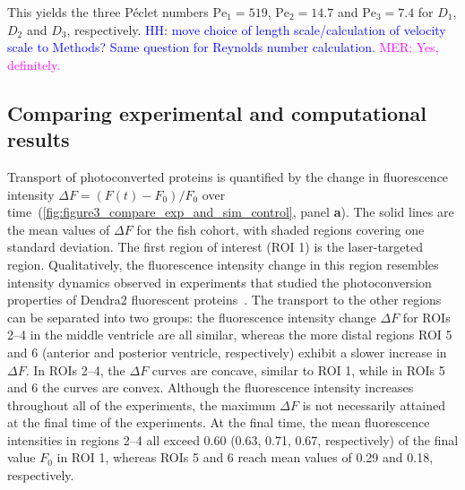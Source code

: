 \documentclass[fleqn]{wlscirep}
\newcommand{\dx}{\, \mathrm d\bm{x}}
\newcommand{\uu}{\mathbf{u}}
\newcommand{\lyng}[1]{\textcolor{blue}{#1}}
\newcommand{\mer}[1]{\textcolor{magenta}{#1}}
\begin{document}
This yields the three Péclet numbers $\mathrm{Pe}_1=519$, $\mathrm{Pe}_2=14.7$ and $\mathrm{Pe}_3=7.4$ for $D_1$, $D_2$ and $D_3$, respectively. \lyng{HH: move choice of length scale/calculation of velocity scale to Methods? Same question for Reynolds number calculation.} \mer{MER: Yes, definitely.}
 
\subsection*{Comparing experimental and computational results}
Transport of photoconverted proteins is quantified by the change in fluorescence intensity $\Delta F=(F(t)-F_0)/F_0$ over time~(\cref{fig:figure3_compare_exp_and_sim_control}, panel \textbf{a}). The solid lines are the mean values of $\Delta F$ for the fish cohort, with shaded regions covering one standard deviation. The first region of interest (ROI 1) is the laser-targeted region. Qualitatively, the fluorescence intensity change in this region resembles intensity dynamics observed in experiments that studied the photoconversion properties of Dendra2 fluorescent proteins~\cite{Makarov2014Steady-stateDendra2}. The transport to the other regions can be separated into two groups: the fluorescence intensity change $\Delta F$ for ROIs 2--4 in the middle ventricle are all similar, whereas the more distal regions ROI 5 and 6 (anterior and posterior ventricle, respectively) exhibit a slower increase in $\Delta F$. In ROIs 2--4, the $\Delta F$ curves are concave, similar to ROI 1, while in ROIs 5 and 6 the curves are convex. Although the fluorescence intensity increases throughout all of the experiments, the maximum $\Delta F$ is not necessarily attained at the final time of the experiments. At the final time, the mean fluorescence intensities in regions 2--4 all exceed 0.60 (0.63, 0.71, 0.67, respectively) of the final value $F_0$ in ROI 1, whereas ROIs 5 and 6 reach mean values of 0.29 and 0.18, respectively.
\end{document}
